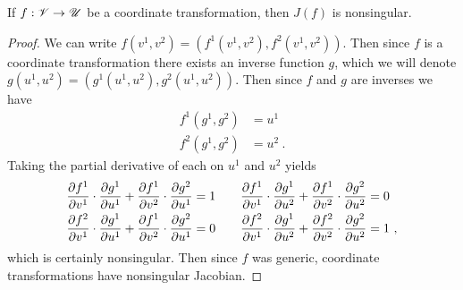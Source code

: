   \begin{lem}
    If $f:\mathscr{V} \to \mathscr{U}$ be a coordinate transformation, then $J(f)$ is nonsingular.
  \end{lem}

  \begin{proof}
    We can write $f(v^1, v^2) = (f^1(v^1, v^2), f^2(v^1, v^2))$. Then since $f$ is a coordinate transformation there exists an inverse function $g$, which we will denote $g(u^1, u^2) = (g^1(u^1, u^2), g^2(u^1, u^2))$. Then since $f$ and $g$ are inverses we have
    \begin{align*}
      f^1(g^1, g^2) &= u^1\\
      f^2(g^1, g^2) &= u^2 \ .
    \end{align*}
    Taking the partial derivative of each on $u^1$ and $u^2$ yields
    \newcommand{\fdg}[3]{\frac{\del f^{#1}}{\del v^{#2}} \cdot \frac{\del g^{#2}}{\del u^{#3}}}
    \begin{equation*}
      \begin{aligned}[c]
        \fdg{1}{1}{1} + \fdg{1}{2}{1} &= 1\\
        \fdg{2}{1}{1} + \fdg{1}{2}{1} &= 0
      \end{aligned}\qquad
      \begin{aligned}[c]
        \fdg{1}{1}{2} + \fdg{1}{2}{2} &= 0\\
        \fdg{2}{1}{2} + \fdg{2}{2}{2} &= 1 \ ,
      \end{aligned}
    \end{equation*}
    which is certainly nonsingular. Then since $f$ was generic, coordinate transformations have nonsingular Jacobian.
  \end{proof}

